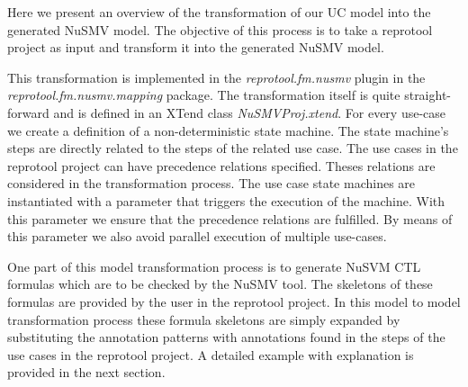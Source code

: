 Here we present an overview of the transformation of our UC model into the generated NuSMV model. The objective of this process is to
take a reprotool project as input and transform it into the generated NuSMV model.

This transformation is implemented in the \emph{reprotool.fm.nusmv} plugin in the \emph{reprotool.fm.nusmv.mapping} package.
The transformation itself is quite straight-forward and is defined in an XTend class \emph{NuSMVProj.xtend}.
For every use-case we create a definition of a non-deterministic state machine.
The state machine's steps are directly related to the steps of the related use case.
The use cases in the reprotool project can have precedence relations specified. Theses relations are considered in the
transformation process. The use case state machines are instantiated with a parameter that triggers the execution of the machine.
With this parameter we ensure that the precedence relations are fulfilled. By means of this parameter we also avoid parallel execution
of multiple use-cases.

One part of this model transformation process is to generate NuSVM CTL formulas which are to be checked by the NuSMV tool. The
skeletons of these formulas are provided by the user in the reprotool project. In this model to model transformation process these
formula skeletons are simply expanded by substituting the annotation patterns with annotations found in the steps of the use cases
in the reprotool project. A detailed example with explanation is provided in the next section.
